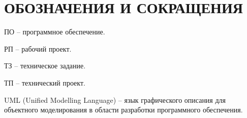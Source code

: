 \section*{ОБОЗНАЧЕНИЯ И СОКРАЩЕНИЯ}

ПО -- программное обеспечение.

РП -- рабочий проект.

ТЗ -- техническое задание.

ТП -- технический проект.

UML (Unified Modelling Language) -- язык графического описания для объектного моделирования в области разработки программного обеспечения.
